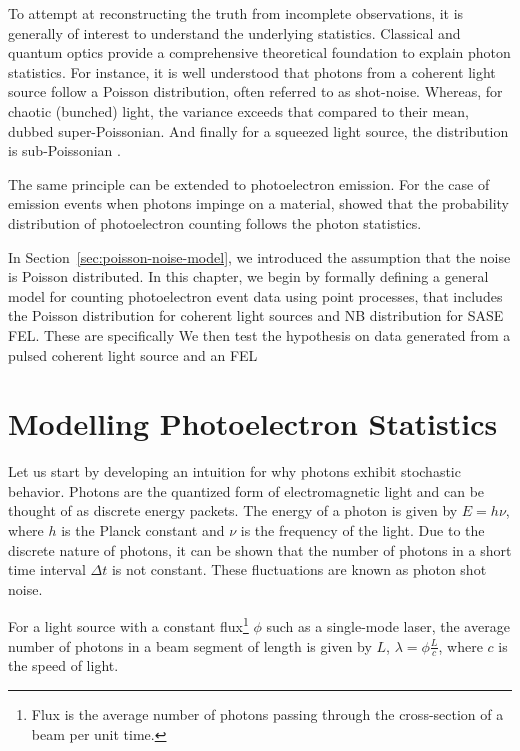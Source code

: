 To attempt at reconstructing the truth from incomplete observations, it is generally of interest to understand the underlying statistics. Classical and quantum optics provide a comprehensive theoretical foundation to explain photon statistics. For instance, it is well understood that photons from a coherent light source follow a Poisson distribution, often referred to as shot-noise. Whereas, for chaotic (bunched) light, the variance exceeds that compared to their mean, dubbed super-Poissonian. And finally for a squeezed light source, the distribution is sub-Poissonian \cite[Chapter~5]{foxQuantumOpticsIntroduction2006}.

The same principle can be extended to photoelectron emission. For the case of emission events when photons impinge on a material, \citeauthor{mandelFluctuationsPhotonBeams1958} \cite{mandelFluctuationsPhotonBeams1958,mandelFluctuationsPhotonBeams1959} showed that the probability distribution of photoelectron counting follows the photon statistics.

In Section~\ref{sec:poisson-noise-model}, we introduced the assumption that the noise is Poisson distributed. In this chapter, we begin by formally defining a general model for counting photoelectron event data using point processes, that includes the Poisson distribution for coherent light sources and \gls{NB} distribution for \gls{SASE} \gls{FEL}. These are specifically We then test the hypothesis on data generated from a pulsed coherent light source and an \gls{FEL}

\section{Modelling Photoelectron Statistics}\label{section:photoelectron-counting-stats}
Let us start by developing an intuition for why photons exhibit stochastic behavior. Photons are the quantized form of electromagnetic light and can be thought of as discrete energy packets. The energy of a photon is given by $E = h\nu$, where $h$ is the Planck constant and $\nu$ is the frequency of the light. Due to the discrete nature of photons, it can be shown that the number of photons in a short time interval $\Delta t$ is not constant. These fluctuations are known as photon shot noise.

For a light source with a constant flux\footnote{Flux is the average number of photons passing through the cross-section of a beam per unit time.} $\phi$ such as a single-mode laser, the average number of photons in a beam segment of length is given by $L$, $\lambda = \phi \frac{L}{c}$, where $c$ is the speed of light.

